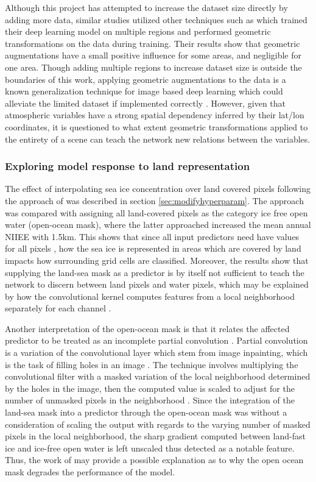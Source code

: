 \documentclass[../main/thesis]{subfiles}
\begin{document}
Although this project has attempted to increase the dataset size directly by adding more data, similar studies utilized other techniques such as \citet{Grigoryev2022} which trained their deep learning model on multiple regions and performed geometric transformations on the data during training. Their results show that geometric augmentations have a small positive influence for some areas, and negligible for one area. Though adding multiple regions to increase dataset size is outside the boundaries of this work, applying geometric augmentations to the data is a known generalization technique for image based deep learning which \citet{Grigoryev2022} could alleviate the limited dataset if implemented correctly \citep{Shorten2019}. However, given that atmospheric variables have a strong spatial dependency inferred by their lat/lon coordinates, it is questioned to what extent geometric transformations applied to the entirety of a scene can teach the network new relations between the variables.

\subsubsection{Exploring model response to land representation}
\label{sec:tuning_model}
The effect of interpolating sea ice concentration over land covered pixels following the approach of \citet{Wang2017} was described in section \ref{sec:modifyhyperparam}. The approach was compared with assigning all land-covered pixels as the category ice free open water (open-ocean mask), where the latter approached increased the mean annual NIIEE with 1.5km. This shows that since all input predictors need have values for all pixels \citep{Ronneberger2015}, how the sea ice is represented in areas which are covered by land impacts how surrounding grid cells are classified. Moreover, the results show that supplying the land-sea mask as a predictor is by itself not sufficient to teach the network to discern between land pixels and water pixels, which may be explained by how the convolutional kernel computes features from a local neighborhood separately for each channel \citep{Fukushima1980}.

Another interpretation of the open-ocean mask is that it relates the affected predictor to be treated as an incomplete partial convolution \citep{Liu2018}. Partial convolution is a variation of the convolutional layer which stem from image inpainting, which is the task of filling holes in an image \citep{Liu2018}. The technique involves multiplying the convolutional filter with a masked variation of the local neighborhood determined by the holes in the image, then the computed value is scaled to adjust for the number of unmasked pixels in the neighborhood \citep{Liu2018}. Since the integration of the land-sea mask into a predictor through the open-ocean mask was without a consideration of scaling the output with regards to the varying number of masked pixels in the local neighborhood, the sharp gradient computed between land-fast ice and ice-free open water is left unscaled thus detected as a notable feature. Thus, the work of \citet{Liu2018} may provide a possible explanation as to why the open ocean mask degrades the performance of the model. 
\end{document}
